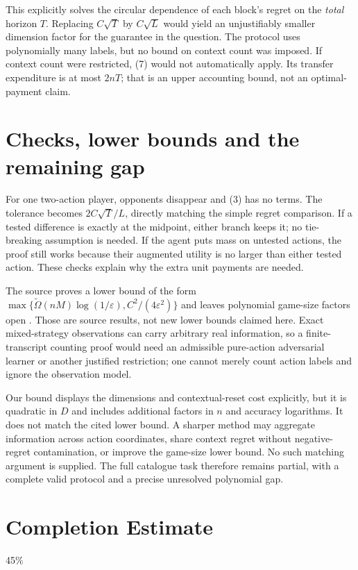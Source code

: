\documentclass[11pt,a4paper]{article}
\begin{document}
This explicitly solves the circular dependence of each block's regret on the \emph{total} horizon $T$. Replacing $C\sqrt T$ by $C\sqrt L$ would yield an unjustifiably smaller dimension factor for the guarantee in the question. The protocol uses polynomially many labels, but no bound on context count was imposed. If context count were restricted, (7) would not automatically apply. Its transfer expenditure is at most $2nT$; that is an upper accounting bound, not an optimal-payment claim.

\section{Checks, lower bounds and the remaining gap}
For one two-action player, opponents disappear and (3) has no terms. The tolerance becomes $2C\sqrt T/L$, directly matching the simple regret comparison. If a tested difference is exactly at the midpoint, either branch keeps it; no tie-breaking assumption is needed. If the agent puts mass on untested actions, the proof still works because their augmented utility is no larger than either tested action. These checks explain why the extra unit payments are needed.

The source proves a lower bound of the form
$\max\{\widetilde\Omega(nM)\log(1/\varepsilon),
 C^2/(4\varepsilon^2)\}$ and leaves polynomial game-size factors open \cite{source}. Those are source results, not new lower bounds claimed here. Exact mixed-strategy observations can carry arbitrary real information, so a finite-transcript counting proof would need an admissible pure-action adversarial learner or another justified restriction; one cannot merely count action labels and ignore the observation model.

Our bound displays the dimensions and contextual-reset cost explicitly, but it is quadratic in $D$ and includes additional factors in $n$ and accuracy logarithms. It does not match the cited lower bound. A sharper method may aggregate information across action coordinates, share context regret without negative-regret contamination, or improve the game-size lower bound. No such matching argument is supplied. The full catalogue task therefore remains partial, with a complete valid protocol and a precise unresolved polynomial gap.

\section{Completion Estimate}
45\%
\end{document}
